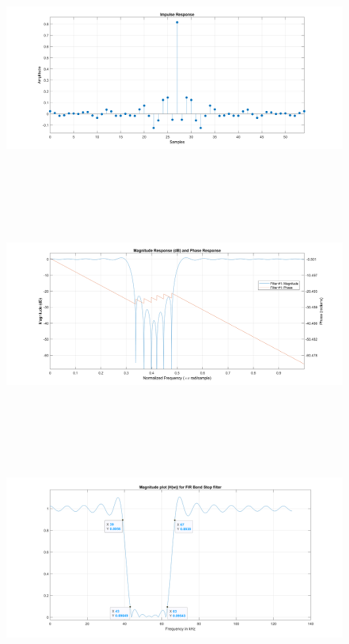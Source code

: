 \documentclass[12pt]{article}
\begin{document}
\begin{figure}[H]
	\centering
	\includegraphics[width = 18cm]{FIRFilter2hn.png}
\end{figure}
\begin{figure}[H]
	\centering
	\includegraphics[width = 18cm, height = 10cm]{FIRFilter2MagPhase.png}
\end{figure}
\begin{figure}[H]
	\centering
	\includegraphics[width = 18cm]{FIRFilter2UBSF.png}
\end{figure}
\end{document}

